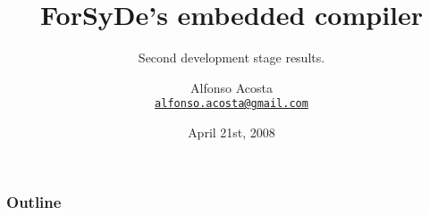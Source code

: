 \documentclass{beamer}
\title%
{ForSyDe's embedded compiler}
\subtitle{Second development stage results.}
\author[A.Acosta] %
{Alfonso Acosta\\
\footnotesize \href{mailto:alfonso.acosta@gmail.com}{\nolinkurl{alfonso.acosta@gmail.com}}}
\institute[KTH] %
{ICT/ECS\\Royal Institute of Technology, Stockholm}
\date%
{April 21st, 2008}
\begin{document}
\begin{frame}
  \titlepage
\end{frame}

\begin{frame}
  \frametitle{Outline}
  \tableofcontents[pausesections]
\end{frame}





\beamerdefaultoverlayspecification{}
\end{document}
